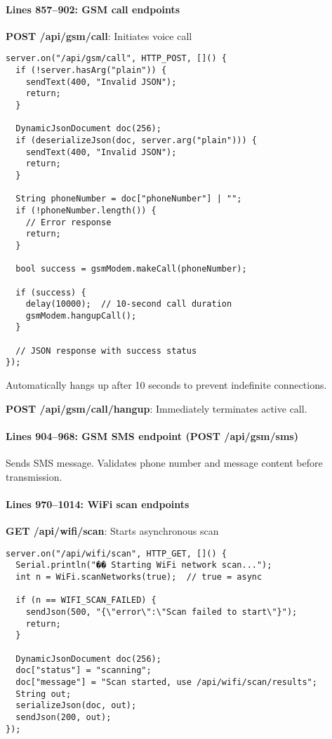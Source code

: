 \documentclass[11pt,a4paper]{article}
\begin{document}
\paragraph{Lines 857--902: GSM call endpoints}
\textbf{POST /api/gsm/call}: Initiates voice call
\begin{verbatim}
server.on("/api/gsm/call", HTTP_POST, []() {
  if (!server.hasArg("plain")) { 
    sendText(400, "Invalid JSON"); 
    return; 
  }
  
  DynamicJsonDocument doc(256);
  if (deserializeJson(doc, server.arg("plain"))) { 
    sendText(400, "Invalid JSON"); 
    return; 
  }
  
  String phoneNumber = doc["phoneNumber"] | "";
  if (!phoneNumber.length()) { 
    // Error response
    return; 
  }
  
  bool success = gsmModem.makeCall(phoneNumber);
  
  if (success) {
    delay(10000);  // 10-second call duration
    gsmModem.hangupCall();
  }
  
  // JSON response with success status
});
\end{verbatim}

Automatically hangs up after 10 seconds to prevent indefinite connections.

\textbf{POST /api/gsm/call/hangup}: Immediately terminates active call.

\paragraph{Lines 904--968: GSM SMS endpoint (POST /api/gsm/sms)}
Sends SMS message. Validates phone number and message content before transmission.

\paragraph{Lines 970--1014: WiFi scan endpoints}
\textbf{GET /api/wifi/scan}: Starts asynchronous scan
\begin{verbatim}
server.on("/api/wifi/scan", HTTP_GET, []() {
  Serial.println("�� Starting WiFi network scan...");
  int n = WiFi.scanNetworks(true);  // true = async
  
  if (n == WIFI_SCAN_FAILED) {
    sendJson(500, "{\"error\":\"Scan failed to start\"}");
    return;
  }
  
  DynamicJsonDocument doc(256);
  doc["status"] = "scanning";
  doc["message"] = "Scan started, use /api/wifi/scan/results";
  String out;
  serializeJson(doc, out);
  sendJson(200, out);
});
\end{verbatim}
\end{document}
